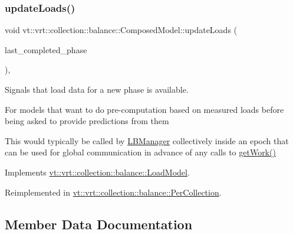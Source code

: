 \subsubsection{\texorpdfstring{update\+Loads()}{updateLoads()}}
{\footnotesize\ttfamily void vt\+::vrt\+::collection\+::balance\+::\+Composed\+Model\+::update\+Loads (\begin{DoxyParamCaption}\item[{\hyperlink{namespacevt_a46ce6733d5cdbd735d561b7b4029f6d7}{Phase\+Type}}]{last\+\_\+completed\+\_\+phase }\end{DoxyParamCaption})\hspace{0.3cm}{\ttfamily [override]}, {\ttfamily [virtual]}}



Signals that load data for a new phase is available. 

For models that want to do pre-\/computation based on measured loads before being asked to provide predictions from them

This would typically be called by \hyperlink{structvt_1_1vrt_1_1collection_1_1balance_1_1_l_b_manager}{L\+B\+Manager} collectively inside an epoch that can be used for global communication in advance of any calls to \hyperlink{classvt_1_1vrt_1_1collection_1_1balance_1_1_composed_model_a5de9a43648cfd18ca00f1f0a6c61be4d}{get\+Work()} 

Implements \hyperlink{classvt_1_1vrt_1_1collection_1_1balance_1_1_load_model_a4f1c6fb5d7d7a0b147755f025b1d5f5c}{vt\+::vrt\+::collection\+::balance\+::\+Load\+Model}.



Reimplemented in \hyperlink{structvt_1_1vrt_1_1collection_1_1balance_1_1_per_collection_a2b41fbbe2b684654f8dbfd9207b77501}{vt\+::vrt\+::collection\+::balance\+::\+Per\+Collection}.



\subsection{Member Data Documentation}
\mbox{\label{classvt_1_1vrt_1_1collection_1_1balance_1_1_composed_model_a8a2a6b2d5e79a7c02002132913c9ae55}} 
